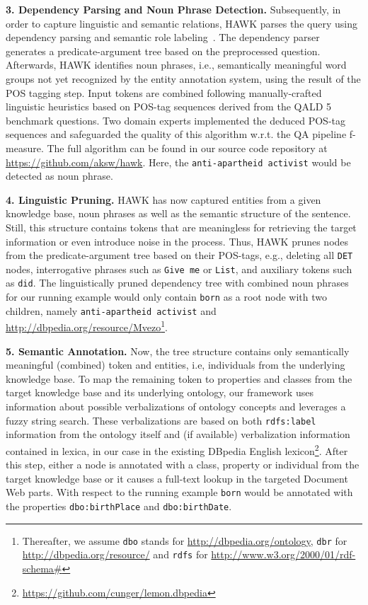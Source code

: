 \textbf{3. Dependency Parsing and Noun Phrase Detection.}
Subsequently, in order to capture linguistic and semantic relations, HAWK parses the query using dependency parsing and semantic role labeling~\cite{choi2011getting}.
The dependency parser generates a predicate-argument tree based on the preprocessed question.
Afterwards, HAWK identifies noun phrases, i.e., semantically meaningful word groups not yet recognized by the entity annotation system, using the result of the POS tagging step. 
Input tokens are combined following manually-crafted linguistic heuristics based on POS-tag sequences derived from the QALD 5 benchmark questions. %
Two domain experts implemented the deduced POS-tag sequences and safeguarded the quality of this algorithm w.r.t. the QA pipeline f-measure. 
The full algorithm can be found in our source code repository at \url{https://github.com/aksw/hawk}.
Here, the \texttt{anti-apartheid activist} would be detected as noun phrase.

\textbf{4. Linguistic Pruning.}
HAWK has now captured entities from a given knowledge base, noun phrases as well as the semantic structure of the sentence. 
Still, this structure contains tokens that are meaningless for retrieving the target information or even introduce noise in the process.
Thus, HAWK prunes nodes from the predicate-argument tree based on their POS-tags, e.g., deleting all \texttt{DET} nodes, interrogative phrases such as \texttt{Give me} or \texttt{List}, and auxiliary tokens such as \texttt{did}.
The linguistically pruned dependency tree with combined noun phrases for our running example would only contain \texttt{born} as a root node with two children, namely \texttt{anti-apartheid activist} and \url{http://dbpedia.org/resource/Mvezo}\footnote{Thereafter, we assume \texttt{dbo} stands for \url{http://dbpedia.org/ontology}, \texttt{dbr} for \url{http://dbpedia.org/resource/} and \texttt{rdfs} for \url{http://www.w3.org/2000/01/rdf-schema\#} }.

\textbf{5. Semantic Annotation.}
Now, the tree structure contains only semantically meaningful (combined) token and entities, i.e, individuals from the underlying knowledge base. 
To map the remaining token to properties and classes from the target knowledge base and its underlying ontology, our framework uses information about possible verbalizations of ontology concepts and leverages a fuzzy string search.
These verbalizations are based on both \texttt{rdfs:label} information from the ontology itself and (if available) verbalization information contained in lexica, in our case in the existing DBpedia English lexicon\footnote{\url{https://github.com/cunger/lemon.dbpedia}}.
After this step, either a node is annotated with a class, property or individual from the target knowledge base or it causes a full-text lookup in the targeted Document Web parts.
With respect to the running example \texttt{born} would be annotated with the properties \texttt{dbo:birthPlace} and \texttt{dbo:birthDate}.

